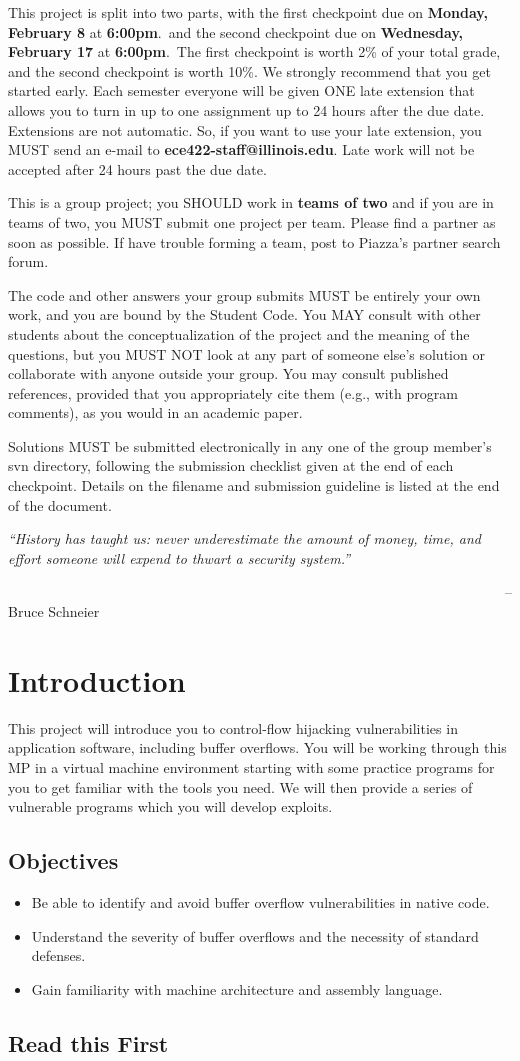 \documentclass[letterpaper,12pt]{report}
\makeatletter
\newcommand{\htitle}
{
     \noindent\parbox{\textwidth}
    {
        \course\hfill \distdate\newline
        \coursename\hfill 
        \settitle \vspace*{-.5ex}\newline
        \mbox{}\hrulefill\mbox{}
    }
    \vspace{8pt}
    \begin{center}{\Large\bf{\settitle}}\end{center}
}
\newcommand{\handout}
{
    \thispagestyle{empty}
    \markboth{}{}
    \pagestyle{plain}
    \htitle
}
\newcommand{\problemsetheader}
{
\setlength{\parindent}{0pt}

\medskip

This project is split into two parts, with the first checkpoint due on {\bf Monday, February 8} at {\bf 6:00pm}.\ and the second checkpoint due on  {\bf Wednesday, February 17} at {\bf 6:00pm}.\ The first checkpoint is worth 2\% of your total grade, and the second checkpoint is worth 10\%. We strongly recommend
that you get started early. Each semester everyone will be given ONE late extension that allows
you to turn in up to one assignment up to 24 hours after the due date. Extensions are not automatic.
So, if you want to use your late extension, you MUST send an e-mail to {\bf ece422-staff@illinois.edu}.
Late work will not be accepted after 24 hours past the due date.


\medskip

This is a group project; you SHOULD work in {\bf teams of two} and if you are in teams of two, you
MUST submit one project per team. Please find a partner as soon as possible. If have trouble
forming a team, post to Piazza's partner search forum.


\medskip

The code and other answers your group submits MUST be entirely your own work, and you are bound
by the Student Code. You MAY consult with other students about the conceptualization of the
project and the meaning of the questions, but you MUST NOT look at any part of someone else's
solution or collaborate with anyone outside your group. You may consult published references,
provided that you appropriately cite them (e.g., with program comments), as you would in an
academic paper.

\medskip

Solutions MUST be submitted electronically in any one of the group member's svn directory,
following the submission checklist given at the end of each checkpoint. Details on the filename and
submission guideline is listed at the end of the document.


\medskip

\hrulefill
}
\makeatother
\begin{document}
\handout
\problemsetheader

\medskip
\emph{``History has taught us: never underestimate the amount of money, time, and effort someone will expend to thwart a security system.''}

~~~~~~~~~~~~~~~~~~~~~~~~~~~~~~~~~~~~~~~~~~~~~~~~~~~~~~~~~~~~~~~~~~~~~~~-- Bruce Schneier 
\pagebreak
\section*{Introduction}

This project will introduce you to control-flow hijacking vulnerabilities in application software, including buffer overflows. You will be working through this MP in a virtual machine environment starting with some practice programs for you to get familiar with the tools you need. We will then provide a series of vulnerable programs which you will develop exploits.

\subsection*{Objectives}
\begin{itemize}
\item Be able to identify and avoid buffer overflow vulnerabilities in native code.
\item Understand the severity of buffer overflows and the necessity of standard defenses.
\item Gain familiarity with machine architecture and assembly language.
\end{itemize}

\subsection*{Read this First}
\end{document}

